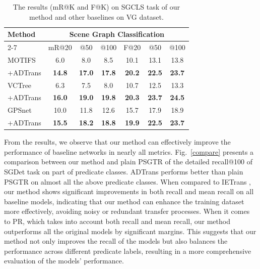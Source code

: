 \documentclass[letterpaper]{article} %
\begin{document}
\begin{table}[]
\tabcolsep=0.1cm

\begin{tabular}{l|cccccc}
\hline
\multirow{2}{*}{Method} & \multicolumn{6}{c}{Scene Graph Classification}                                                                     \\ \cline{2-7}
                        & mR@20         & @50         & \multicolumn{1}{c|}{@100}        & F@20          & @50          & @100         \\ \hline
MOTIFS                  & 6.0           & 8.0           & \multicolumn{1}{c|}{8.5}           & 10.1          & 13.1          & 13.8          \\
\quad+ADTrans                & \textbf{14.8} & \textbf{17.0} & \multicolumn{1}{c|}{\textbf{17.8}} & \textbf{20.2} & \textbf{22.5} & \textbf{23.7} \\ \hline
VCTree                  & 6.3           & 7.5           & \multicolumn{1}{c|}{8.0}           & 10.7          & 12.5          & 13.3          \\
\quad+ADTrans                & \textbf{16.0} & \textbf{19.0} & \multicolumn{1}{c|}{\textbf{19.8}} & \textbf{20.3} & \textbf{23.7} & \textbf{24.5} \\ \hline
GPSnet                  & 10.0          & 11.8          & \multicolumn{1}{c|}{12.6}          & 15.7          & 17.9          & 18.9          \\
\quad+ADTrans                & \textbf{15.5} & \textbf{18.2} & \multicolumn{1}{c|}{\textbf{18.8}} & \textbf{19.9} & \textbf{22.5} & \textbf{23.7} \\ \hline
\end{tabular}
\caption{The results (mR@K and F@K) on SGCLS task of our method and other baselines on VG dataset.}
\label{sgcls}
\end{table}

 From the results, we observe that our method can effectively improve the performance of baseline networks in nearly all metrics. Fig.~\ref{compare} presents a comparison between our method and plain PSGTR of the detailed recall@100 of SGDet task on part of predicate classes. ADTrans performs better than plain PSGTR on almost all the above predicate classes. When compared to IETrans \cite{zhang2022fine}, our method shows significant improvements in both recall and mean recall on all baseline models, indicating that our method can enhance the training dataset more effectively, avoiding noisy or redundant transfer processes. When it comes to PR, which takes into account both recall and mean recall, our method outperforms all the original models by significant margins. This suggests that our method not only improves the recall of the models but also balances the performance across different predicate labels, resulting in a more comprehensive evaluation of the models' performance.
\end{document}
